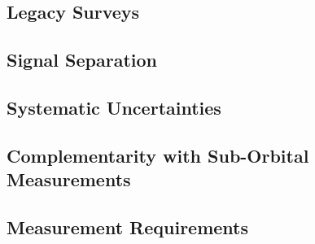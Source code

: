 \documentclass[11pt]{article}
\begin{document}

\subsection{Legacy Surveys} %

%




\subsection{Signal Separation}%
\label{sec:signal_separation}




\subsection{Systematic Uncertainties}%
\label{sec:systematics}



\subsection{Complementarity with Sub-Orbital Measurements} %




\subsection{Measurement Requirements} %
\label{requirements}





%

\end{document}

